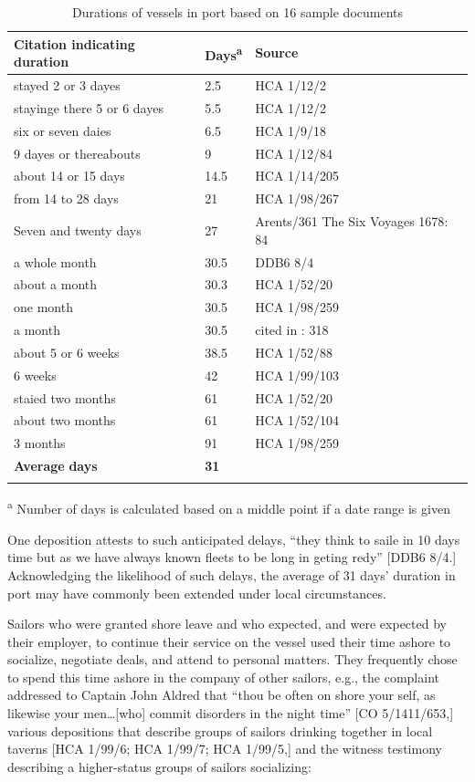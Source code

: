 \begin{table}
\caption{\label{tab:key:4.4} Durations of vessels in port based on 16 sample documents}

\begin{tabularx}{\textwidth}{Qll}
\lsptoprule
\textbf{Citation} \textbf{indicating} \textbf{duration} & \textbf{Days}\textsuperscript{a} & \textbf{Source}\\
\midrule
 stayed 2 or 3 dayes & 2.5 & HCA 1/12/2\\
stayinge there 5 or 6 dayes & 5.5 & HCA 1/12/2\\
six or seven daies & 6.5 & HCA 1/9/18\\
9 dayes or thereabouts & 9 & HCA 1/12/84\\
about 14 or 15 days & 14.5 & HCA 1/14/205\\
from 14 to 28 days & 21 & HCA 1/98/267\\
Seven and twenty days & 27 & Arents/361 The Six  {Voyages 1678}: 84\\
a whole month & 30.5 & DDB6 8/4\\
about a month & 30.3 & HCA 1/52/20\\
one month & 30.5 & HCA 1/98/259\\
a month & 30.5 & cited in \citealt{Bicheno2012}: 318\\
about 5 or 6 weeks & 38.5 & HCA 1/52/88\\
6 weeks & 42 & HCA 1/99/103\\
staied two months & 61 & HCA 1/52/20\\
about two months & 61 & HCA 1/52/104\\
3 months & 91 & HCA 1/98/259\\
\midrule 
 \textbf{Average} \textbf{days} & \textbf{31} & \\
\lspbottomrule
\end{tabularx}
\textsuperscript{a}\textbf{\textsuperscript{} }Number of days is calculated based on a middle point if a date range is given 
\end{table}

One deposition attests to such anticipated delays, “they think to saile in 10 days time but as we have always known fleets to be long in geting redy” [DDB6 8/4.] Acknowledging the likelihood of such delays, the average of 31 days’ duration in port may have commonly been extended under local circumstances.

Sailors who were granted shore leave and who expected, and were expected by their employer, to continue their service on the vessel used their time ashore to socialize, negotiate deals, and attend to personal matters. They frequently chose to spend this time ashore in the company of other sailors, e.g., the complaint addressed to Captain John Aldred that “thou be often on shore your self, as likewise your men…[who] commit disorders in the night time” [CO 5/1411/653,] various depositions that describe groups of sailors drinking together in local taverns [HCA 1/99/6; HCA 1/99/7; HCA 1/99/5,] and the witness testimony describing a higher-status groups of sailors socializing:

